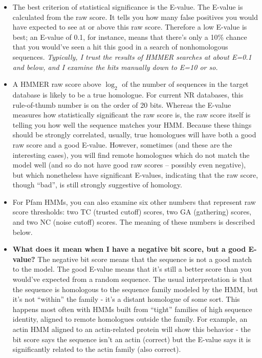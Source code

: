 \begin{itemize}

\item The best criterion of statistical significance is the E-value.
The E-value is calculated from the raw score. It tells you how many
false positives you would have expected to see at or above this raw
score. Therefore a low E-value is best; an E-value of 0.1, for
instance, means that there's only a 10\% chance that you would've seen
a hit this good in a search of nonhomologous sequences. {\em
Typically, I trust the results of HMMER searches at about E=0.1 and
below, and I examine the hits manually down to E=10 or so.}

\item A HMMER raw score above $\log_2$ of the number of sequences
in the target database is likely to be a true homologue. For current
NR databases, this rule-of-thumb number is on the order of 20 bits.
Whereas the E-value measures how statistically significant the raw
score is, the raw score itself is telling you how well the sequence
matches your HMM. Because these things should be strongly correlated,
usually, true homologues will have both a good raw score and a good
E-value. However, sometimes (and these are the interesting cases), you
will find remote homologues which do not match the model well (and so
do not have good raw scores -- possibly even negative), but which
nonetheless have significant E-values, indicating that the raw score,
though ``bad'', is still strongly suggestive of homology.

\item For Pfam HMMs, you can also examine six other numbers that
represent raw score thresholds: two TC (trusted cutoff) scores, two GA
(gathering) scores, and two NC (noise cutoff) scores. The meaning of
these numbers is described below.

\item \textbf{What does it mean when I have a negative bit score,
but a good E-value?} The negative bit score means that the sequence is
not a good match to the model. The good E-value means that it's still
a better score than you would've expected from a random sequence. The
usual interpretation is that the sequence is homologous to the
sequence family modeled by the HMM, but it's not ``within'' the family
- it's a distant homologue of some sort. This happens most often with
HMMs built from ``tight'' families of high sequence identity, aligned
to remote homologues outside the family. For example, an actin HMM
aligned to an actin-related protein will show this behavior - the bit
score says the sequence isn't an actin (correct) but the E-value says
it is significantly related to the actin family (also correct).

\end{itemize}



